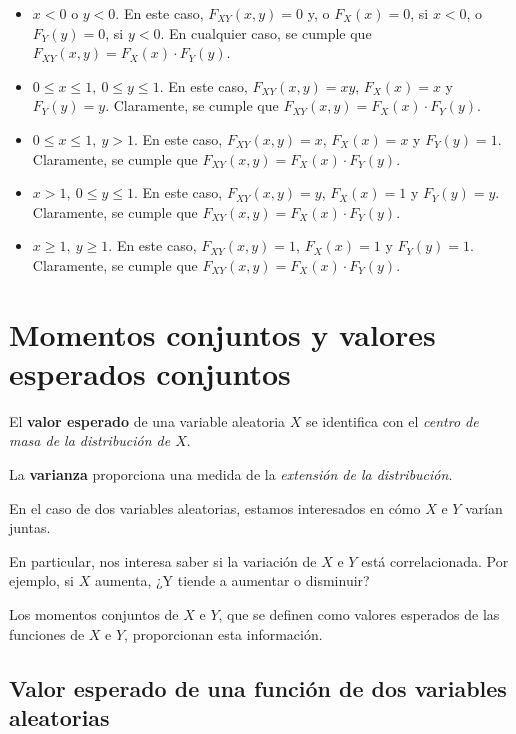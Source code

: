 \documentclass[
  letterpaper,
  DIV=11,
  numbers=noendperiod]{scrreprt}
\begin{document}
\begin{itemize}
\item
  \(x<0\) o \(y<0\). En este caso, \(F_{XY}(x,y)=0\) y, o \(F_X(x)=0\),
  si \(x<0\), o \(F_Y(y)=0\), si \(y<0\). En cualquier caso, se cumple
  que \(F_{XY}(x,y)=F_X(x)\cdot F_Y(y)\).
\item
  \(0\leq x\leq 1,\ 0\leq y\leq 1\). En este caso, \(F_{XY}(x,y)=xy\),
  \(F_X(x)=x\) y \(F_Y(y)=y\). Claramente, se cumple que
  \(F_{XY}(x,y)=F_X(x)\cdot F_Y(y)\).
\item
  \(0\leq x\leq 1,\ y> 1\). En este caso, \(F_{XY}(x,y)=x\),
  \(F_X(x)=x\) y \(F_Y(y)=1\). Claramente, se cumple que
  \(F_{XY}(x,y)=F_X(x)\cdot F_Y(y)\).
\item
  \(x >1,\ 0\leq y\leq 1\). En este caso, \(F_{XY}(x,y)=y\),
  \(F_X(x)=1\) y \(F_Y(y)=y\). Claramente, se cumple que
  \(F_{XY}(x,y)=F_X(x)\cdot F_Y(y)\).
\item
  \(x\geq 1,\ y\geq 1\). En este caso, \(F_{XY}(x,y)=1\), \(F_X(x)=1\) y
  \(F_Y(y)=1\). Claramente, se cumple que
  \(F_{XY}(x,y)=F_X(x)\cdot F_Y(y)\).
\end{itemize}

\hypertarget{momentos-conjuntos-y-valores-esperados-conjuntos}{%
\section{Momentos conjuntos y valores esperados
conjuntos}\label{momentos-conjuntos-y-valores-esperados-conjuntos}}

El \textbf{valor esperado} de una variable aleatoria \(X\) se identifica
con el \emph{centro de masa de la distribución de \(X\)}.

La \textbf{varianza} proporciona una medida de la \emph{extensión de la
distribución}.

En el caso de dos variables aleatorias, estamos interesados en cómo
\(X\) e \(Y\) varían juntas.

En particular, nos interesa saber si la variación de \(X\) e \(Y\) está
correlacionada. Por ejemplo, si \(X\) aumenta, ¿Y tiende a aumentar o
disminuir?

Los momentos conjuntos de \(X\) e \(Y\), que se definen como valores
esperados de las funciones de \(X\) e \(Y\), proporcionan esta
información.

\hypertarget{valor-esperado-de-una-funciuxf3n-de-dos-variables-aleatorias}{%
\subsection{Valor esperado de una función de dos variables
aleatorias}\label{valor-esperado-de-una-funciuxf3n-de-dos-variables-aleatorias}}
\end{document}
